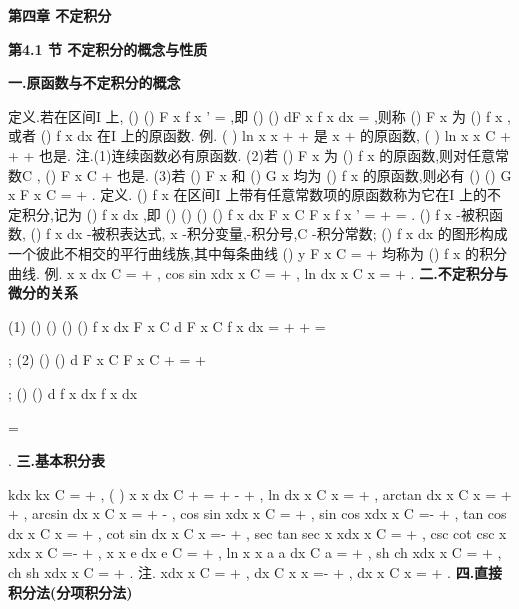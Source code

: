 \begin{center}
{\Large \bfseries \textcolor{lyred}{第四章 不定积分}}
\end{center}

\vspace{6pt}
{\large \bfseries \textcolor{lyred}{第4.1 节 不定积分的概念与性质}}

\vspace{4pt}
{\bfseries \textcolor{lyred}{一.原函数与不定积分的概念}}

\textcolor{lyred}{定义}.若在区间I 上,
()
()
F
x
f x
'
=
,即
()
()
dF x
f x dx
=
,则称
()
F x 为
()
f x ,或者 
()
f x dx 在I 上的\textcolor{lyred}{原函数}. 
\textcolor{lyred}{例}. (
)
ln
x
x
+
+
是
x
+
的原函数, (
)
ln
x
x
C
+
+
+
也是. 
\textcolor{lyred}{注}.(1)连续函数必有原函数. 
(2)若
()
F x 为
()
f x 的原函数,则对任意常数C ,
()
F x
C
+
也是. 
(3)若
()
F x 和
()
G x 均为
()
f x 的原函数,则必有
()
()
G x
F x
C
=
+
. 
\textcolor{lyred}{定义}.
()
f x 在区间I 上带有任意常数项的原函数称为它在I 上的\textcolor{lyred}{不定积分},记为 
()
f x dx
\int 
,即
()
()
()
()
f x dx
F x
C
F
x
f x
'
=
+
\Leftrightarrow 
=
\int 
. 
()
f x -\textcolor{lyred}{被积函数},
()
f x dx -\textcolor{lyred}{被积表达式}, x -\textcolor{lyred}{积分变量},\int -\textcolor{lyred}{积分号},C -\textcolor{lyred}{积分常数}; 
()
f x dx
\int 
的图形构成一个彼此不相交的平行曲线族,其中每条曲线
()
y
F x
C
=
+
均称为
()
f x 的\textcolor{lyred}{积分曲线}. 
\textcolor{lyred}{例}.
x
x dx
C
=
+
\int 
, cos
sin
xdx
x
C
=
+
\int 
,
ln
dx
x
C
x
=
+
\int 
. 
\vspace{4pt}
{\bfseries \textcolor{lyred}{二.不定积分与微分的关系}}

(1)
()
()
()
()
f x dx
F x
C
d F x
C
f x dx
=
+
\Leftrightarrow 
+
=




\int 
; 
(2)
()
()
d F x
C
F x
C
+
=
+




\int 
;
()
()
d
f x dx
f x dx

=


\int 
. 
\vspace{4pt}
{\bfseries \textcolor{lyred}{三.基本积分表}}

kdx
kx
C
=
+
\int 
,
(
)
x
x dx
C
\mu 
\mu 
\mu 
\mu 
+
=
+
\neq -
+
\int 
,
ln
dx
x
C
x =
+
\int 
,
arctan
dx
x
C
x =
+
+
\int 
, 
arcsin
dx
x
C
x
=
+
-
\int 
, cos
sin
xdx
x
C
=
+
\int 
, sin
cos
xdx
x
C
=-
+
\int 
, 
tan
cos
dx
x
C
x =
+
\int 
,
cot
sin
dx
x
C
x =-
+
\int 
, sec tan
sec
x
xdx
x
C
=
+
\int 
, 
csc cot
csc
x
xdx
x
C
=-
+
\int 
,
x
x
e dx
e
C
=
+
\int 
,
ln
x
x
a
a dx
C
a
=
+
\int 
, sh
ch
xdx
x
C
=
+
\int 
, 
ch
sh
xdx
x
C
=
+
\int 
. 
\textcolor{lyred}{注}.
xdx
x
C
=
+
\int 
,
dx
C
x
x
=-
+
\int 
,
dx
x
C
x
=
+
\int 
. 
\vspace{4pt}
{\bfseries \textcolor{lyred}{四.直接积分法(分项积分法)}}

